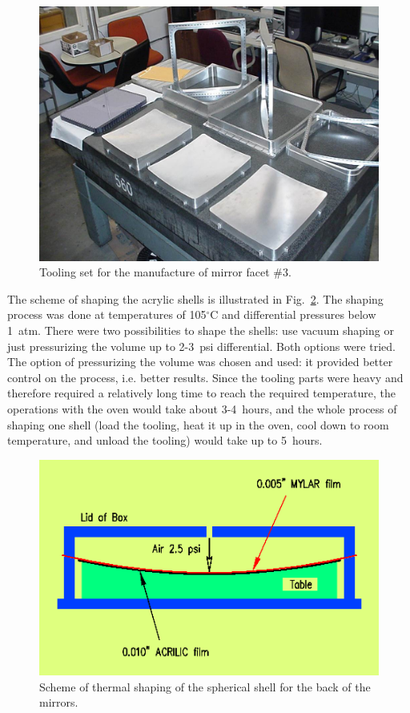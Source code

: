 \begin{figure}[ht]
    \centering
    \includegraphics[width=1.0\linewidth]{images/Tool_on_tbl.jpg}
    \caption{Tooling set for the manufacture of mirror facet \#3.}
    \label{fig:Tool_on_tbl}
\end{figure}

The scheme of shaping the acrylic shells is illustrated in  Fig.~\ref{fig:Shaping_new}. The shaping process
was done at temperatures of 105$^\circ$C and differential pressures below 1~atm. There were two
possibilities to shape the shells: use vacuum shaping or just pressurizing the volume up to 2-3~psi differential.
Both options were tried. The option of pressurizing the volume was chosen and used: it provided better control
on the process, i.e. better results. Since the tooling parts were heavy and therefore required a relatively long
time to reach the required temperature, the operations with the oven would take about 3-4~hours, and the whole
process of shaping one shell (load the tooling, heat it up in the oven, cool down to room temperature, and unload
the tooling) would take up to 5~hours.

\begin{figure}[ht]
    \centering
    \includegraphics[width=1.0\linewidth]{images/Shaping_new.png}
    \caption{Scheme of thermal shaping of the spherical shell for the back of the mirrors.}
    \label{fig:Shaping_new}
\end{figure}

